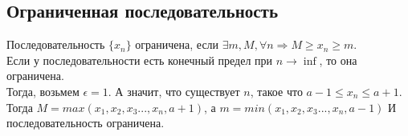\documentclass[a4paper,12pt]{article}
\begin{document}
\subsection{Ограниченная последовательность}
Последовательность $\{x_n\}$ ограничена, если $\exists m, M, \forall n \Rightarrow M \geq x_n \geq m$. \\
Если у последовательности есть конечный предел при $n \rightarrow \inf$, то она ограничена. \\
Тогда, возьмем $\epsilon = 1$. А значит, что существует $n$, такое что $a - 1 \leq x_n \leq a+1$.
Тогда $M = max(x_1, x_2, x_3..., x_n, a + 1)$, а $m = min(x_1, x_2, x_3..., x_n, a - 1)$ И последовательность ограничена.	
\end{document}
